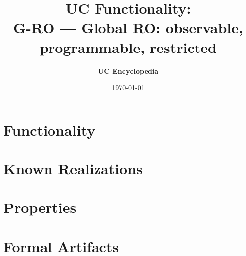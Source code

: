 \documentclass[11pt,a4paper]{article}
\title{\textbf{\Large UC Functionality:}\\[0.2em] \Large G-RO --- Global RO: observable, programmable, restricted}
\author{\textbf{UC Encyclopedia}}
\date{\today}
\newtheorem{functionality}{Functionality}
\begin{document}
\maketitle

\begin{abstract}
\end{abstract}

\section{Functionality}

%

\section{Known Realizations}


\section{Properties}


\section{Formal Artifacts}

\end{document}
